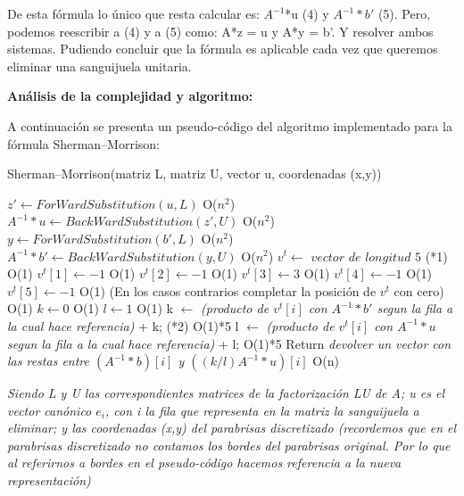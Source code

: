 De esta fórmula lo único que resta calcular es: $A^{-1}$*u (4) y $A^{-1}*b'$ (5).\newline
Pero, podemos reescribir a (4) y a (5) como:\newline
 A*z = u y A*y = b'. Y resolver ambos sistemas. Pudiendo concluir que la fórmula es aplicable cada vez que queremos eliminar una sanguijuela unitaria. \newline
 
 
\textbf{Análisis de la complejidad y algoritmo:} \newline

A continuación se presenta un pseudo-código del algoritmo implementado para la fórmula Sherman–Morrison:

 \begin{algorithm}[H]
\caption{Sherman–Morrison(matriz L, matriz U, vector u, coordenadas (x,y))}
\begin{algorithmic}[1]

\State $ z' \gets ForWardSubstitution(u, L)$ O($n^2$)
\State $ A^{-1}*u \gets BackWardSubstitution(z', U)$ O($n^2$)
\State $ y \gets ForWardSubstitution(b', L)$ O($n^2$)
\State $ A^{-1}*b' \gets BackWardSubstitution(y, U)$ O($n^2$)
\State $ v^t \gets$ $vector$ $de$ $longitud$ $5$ (*1) O(1)
        		\State $ v^t[1] \gets -1  $	O(1)	
	\EndIf
        		\State $ v^t[2] \gets -1  $ 	O(1)	
	\EndIf
			\State $ v^t[3] \gets 3  $ O(1)
        		\State $ v^t[4] \gets -1  $ 	O(1)	
	\EndIf
        		\State $ v^t[5] \gets -1  $ 	O(1)	
	\EndIf
	(En los casos contrarios completar la posición de $v^t$ con cero) O(1)
	 \State $ k \gets 0  $ 	O(1)
	 \State $ l \gets 1  $   O(1)
        		\State k $\gets$ \textit{(producto de $v^t[i]$ con $ A^{-1}*b'$ segun la fila a la cual hace referencia)} + k;	(*2)	 O(1)*5
        		\State l $\gets$ \textit{(producto de $v^t[i]$ con $A^{-1}*u$ segun la fila a la cual hace referencia)} + l; O(1)*5
	\EndIf
\EndFor
\State  Return \textit{devolver un vector con las restas entre  $(A^{-1}*b)[i]$ y  $((k/l)A^{-1}*u)[i]$}    O(n)

\end{algorithmic}
\end{algorithm}
\textit{Siendo L y U las correspondientes matrices de la factorizaci\'on LU de A; u es el vector can\'onico $e_i$, con i la fila que representa en la matriz la sanguijuela a eliminar; y las coordenadas (x,y) del parabrisas discretizado (recordemos que en el parabrisas discretizado no contamos los bordes del parabrisas original. Por lo que al referirnos a bordes en el pseudo-c\'odigo hacemos referencia a la nueva representaci\'on)}\newline\newline
